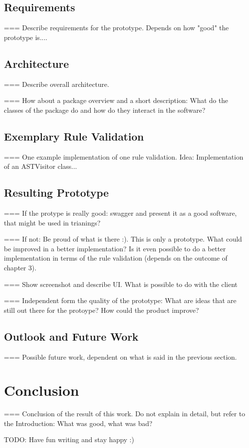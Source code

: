 \section{Requirements}
=== Describe requirements for the prototype. Depends on how "good" the prototype is....
\section{Architecture}
=== Describe overall architecture. 

=== How about a package overview and a short description: What do the classes of the package do and how do they interact in the software? 
\section{Exemplary Rule Validation}
=== One example implementation of one rule validation. Idea: Implementation of an ASTVisitor class...

\section{Resulting Prototype}
=== If the protype is really good: swagger and present it as a good software, that might be used in trianings?

=== If not: Be proud of what is there :). This is only a prototype. What could be improved in a better implementation? Is it even possible to do a better implementation in terms of the rule validation (depends on the outcome of chapter 3).

=== Show screenshot and describe UI. What is possible to do with the client

=== Independent form the quality of the prototype: What are ideas that are still out there for the protoype? 
How could the product improve?
\section{Outlook and Future Work}
=== Possible future work, dependent on what is said in the previous section.


\chapter{Conclusion}
=== Conclusion of the result of this work. Do not explain in detail, but refer to the Introduction: What was good, what was bad?


TODO: Have fun writing and stay happy :)


